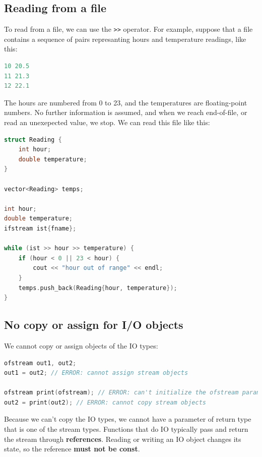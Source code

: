 \subsection{Reading from a file}

To read from a file, we can use the \texttt{>>} operator. For example, suppose that a file
contains a sequence of pairs represanting hours and temperature readings, like this:\\

\begin{lstlisting}[language=C++]
10 20.5
11 21.3
12 22.1
\end{lstlisting}

The hours are numbered from 0 to 23, and the temperatures are floating-point numbers. No further
information is assumed, and when we reach end-of-file, or read an unexepected value, we stop.
We can read this file like this:\\

\begin{lstlisting}[language=C++]
struct Reading {
    int hour;
    double temperature;
}

vector<Reading> temps;

int hour;
double temperature;
ifstream ist{fname};

while (ist >> hour >> temperature) {
    if (hour < 0 || 23 < hour) {
        cout << "hour out of range" << endl;
    }
    temps.push_back(Reading{hour, temperature});
}
\end{lstlisting}

\subsection{No copy or assign for I/O objects}

We cannot copy or assign objects of the IO types:\\

\begin{lstlisting}[language=C++]
ofstream out1, out2;
out1 = out2; // ERROR: cannot assign stream objects

ofstream print(ofstream); // ERROR: can't initialize the ofstream parameter
out2 = print(out2); // ERROR: cannot copy stream objects
\end{lstlisting}

Because we can't copy the IO types, we cannot have a parameter of return type that is one of
the stream types. Functions that do IO typically pass and return the stream through 
\textbf{references}. Reading or writing an IO object changes its state, so the reference
\textbf{must not be const}.

